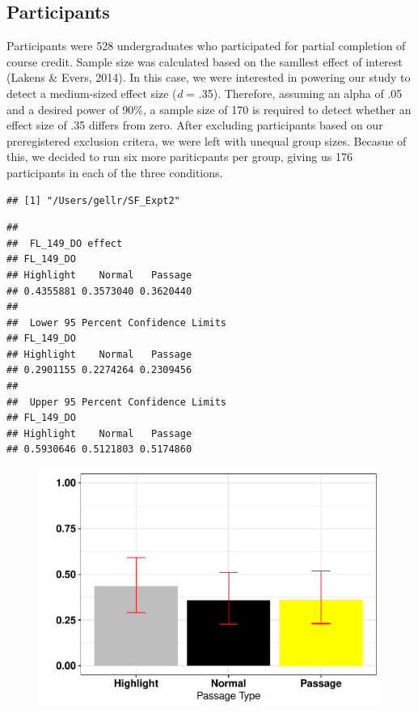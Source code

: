 \documentclass[doc]{apa6}
\begin{document}
\hypertarget{participants-1}{%
\subsection{Participants}\label{participants-1}}

Participants were 528 undergraduates who participated for partial completion of course credit. Sample size was calculated based on the samllest effect of interest (Lakens \& Evers, 2014). In this case, we were interested in powering our study to detect a medium-sized effect size (\emph{d} = .35). Therefore, assuming an alpha of .05 and a desired power of 90\%, a sample size of 170 is required to detect whether an effect size of .35 differs from zero. After excluding participants based on our preregistered exclusion critera, we were left with unequal group sizes. Becasue of this, we decided to run six more pariticpants per group, giving us 176 participants in each of the three conditions.

\begin{verbatim}
## [1] "/Users/gellr/SF_Expt2"
\end{verbatim}

\begin{verbatim}
## 
##  FL_149_DO effect
## FL_149_DO
## Highlight    Normal   Passage 
## 0.4355881 0.3573040 0.3620440 
## 
##  Lower 95 Percent Confidence Limits
## FL_149_DO
## Highlight    Normal   Passage 
## 0.2901155 0.2274264 0.2309456 
## 
##  Upper 95 Percent Confidence Limits
## FL_149_DO
## Highlight    Normal   Passage 
## 0.5930646 0.5121803 0.5174860
\end{verbatim}

\begin{figure}

{\centering \includegraphics{SF_Paper_files/figure-latex/unnamed-chunk-2-1} 

}

\caption{ }\label{fig:unnamed-chunk-2}
\end{figure}
\end{document}

